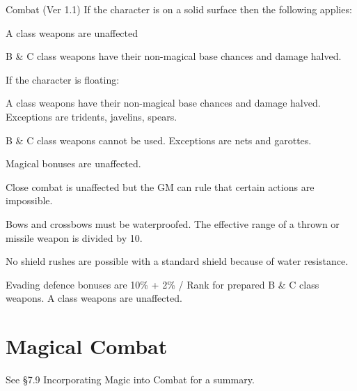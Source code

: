 \begin{Chapter}{Combat (Ver 1.1)}
If the character is on a solid surface then the following applies:

\begin{Itemize}
  
\item A class weapons are unaffected  

\item B \& C class weapons have their non-magical base 
chances and damage halved. 

\end{Itemize}

If the character is floating:  

\begin{Itemize}

\item A class weapons have their non-magical base chances and damage
  halved.  Exceptions are tridents, javelins, spears.

\item B \& C class weapons cannot be used. Exceptions are nets and
  garottes.

\end{Itemize}

Magical bonuses are unaffected. 

Close combat is unaffected but the GM can rule that certain actions
are impossible.

Bows and crossbows must be waterproofed.  The effective range of a
thrown or missile weapon is divided by 10.

No shield rushes are possible with a standard shield because of water
resistance.

Evading defence bonuses are 10\% + 2\% / Rank for prepared B \& C
class weapons.  A class weapons are unaffected.

\section{Magical Combat}

See §7.9 Incorporating Magic into Combat for a summary.

\end{Chapter}
